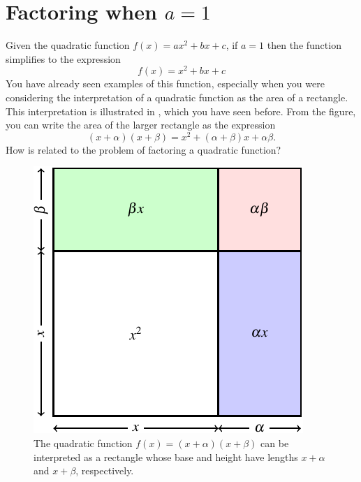 \documentclass[a4paper,oneside,12pt]{article}
\begin{document}
\section{Factoring when $a = 1$}
\label{sec:factor_quadratic_a_1}

Given the quadratic function $f(x) = ax^2 + bx + c$, if $a = 1$ then
the function simplifies to the expression
\begin{equation}
\label{eqn:monic_quadratic_function}
f(x)
=
x^2 + bx + c
\end{equation}
You have already seen examples of this function, especially when you
were considering the interpretation of a quadratic function as the
area of a rectangle.  This interpretation is illustrated in
, which you have seen before.  From
the figure, you can write the area of the larger rectangle as the
expression
\begin{equation}
\label{eqn:monic_quadratic_function_factored}
(x + \alpha) (x + \beta)
=
x^2 + (\alpha + \beta)x + \alpha\beta.
\end{equation}
How is  related to
the problem of factoring a quadratic function?

\begin{figure}[!htbp]
\centering
\includegraphics[scale=1.1]{image/08/quadratic-as-square.pdf}
\caption{%
  The quadratic function $f(x) = (x + \alpha)(x + \beta)$ can be
  interpreted as a rectangle whose base and height have lengths
  $x + \alpha$ and $x + \beta$, respectively.
}
\label{fig:quadratic_as_rectangle}
\end{figure}
\end{document}

